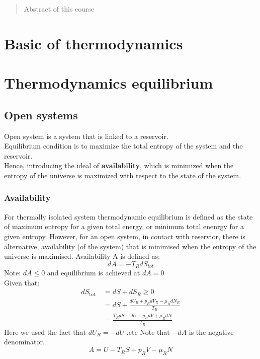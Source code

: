 \documentclass[12pt,a4paper]{article}
\begin{document}
\begin{titlepage}
    \maketitle
\end{titlepage}

\tableofcontents

\newpage

\begin{abstract}
\noindent
Abstract of this course
\end{abstract}
\section{Basic of thermodynamics}

\section{Thermodynamics equilibrium}
    \subsection{Open systems}
    Open system is a system that is linked to a reservoir.\\
    Equilibrium condition is to maximize the total entropy of the system and the reservoir.\\
    Hence, introducing the ideal of \textbf{availability}, which is minimized when the entropy of the universe is maximized with respect to the state of the system.
    \subsubsection{Availability}
    For thermally isolated system thermodynamic equilibrium is defined as the state of maximum entropy  for a given total energy, or minimum total enenrgy for a given entropy. However, for an open system, in contact with reservior, there is alternative, availability (of the system) that is minimised when the entropy of the universe is maximised. 
    Availability A is defined as:
    \begin{equation*}
        dA=-T_R dS_{tot}
    \end{equation*}
    Note: $dA\leq 0$ and equilibrium is achieved at $dA=0$\\
    Given that:
    \begin{align*}
        dS_{\text {tot }} & =d S+d S_R \geq 0 \\
        & =d S+\frac{d U_R+p_R d V_R-\mu_R d N_R}{T_R} \\
        & =\frac{T_R d S-d U-p_R d V+\mu_R d N}{T_R}
    \end{align*}
    Here we used the fact that $dU_R=-dU$ .etc 
    Note that $-dA$ is the negative denominator.
    \begin{equation*}
        A = U- T_RS+p_RV-\mu_R N
    \end{equation*}
\end{document}
